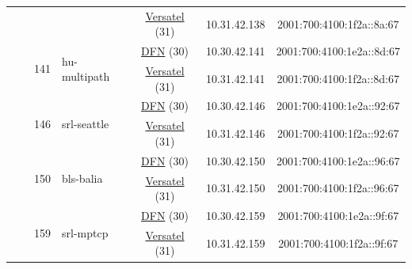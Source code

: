 \begin{small}
\begin{center}
\begin{longtable}{|c|c|c|c|c|c|c|c|}
  &  &  &  & \multicolumn{2}{|c|}{\tiny{\href{http://www.versatel.de}{Versatel} (31)}} & \tiny{10.31.42.138} & \tiny{2001:700:4100:1f2a::8a:67} \\* \cline{3-3}\cline{4-4}\cline{5-5}\cline{6-6}\cline{7-7}\cline{8-8}
  &  & \multirow{2}{*}{\tiny{141}} & \multicolumn{1}{|l|}{\multirow{2}{*}{\tiny{hu-multipath}}} & \multicolumn{2}{|c|}{\tiny{\href{https://www.dfn.de}{DFN} (30)}} & \tiny{10.30.42.141} & \tiny{2001:700:4100:1e2a::8d:67} \\* \cline{5-5}\cline{6-6}\cline{7-7}\cline{8-8}
  &  &  &  & \multicolumn{2}{|c|}{\tiny{\href{http://www.versatel.de}{Versatel} (31)}} & \tiny{10.31.42.141} & \tiny{2001:700:4100:1f2a::8d:67} \\* \cline{3-3}\cline{4-4}\cline{5-5}\cline{6-6}\cline{7-7}\cline{8-8}
  &  & \multirow{2}{*}{\tiny{146}} & \multicolumn{1}{|l|}{\multirow{2}{*}{\tiny{srl-seattle}}} & \multicolumn{2}{|c|}{\tiny{\href{https://www.dfn.de}{DFN} (30)}} & \tiny{10.30.42.146} & \tiny{2001:700:4100:1e2a::92:67} \\* \cline{5-5}\cline{6-6}\cline{7-7}\cline{8-8}
  &  &  &  & \multicolumn{2}{|c|}{\tiny{\href{http://www.versatel.de}{Versatel} (31)}} & \tiny{10.31.42.146} & \tiny{2001:700:4100:1f2a::92:67} \\* \cline{3-3}\cline{4-4}\cline{5-5}\cline{6-6}\cline{7-7}\cline{8-8}
  &  & \multirow{2}{*}{\tiny{150}} & \multicolumn{1}{|l|}{\multirow{2}{*}{\tiny{bls-balia}}} & \multicolumn{2}{|c|}{\tiny{\href{https://www.dfn.de}{DFN} (30)}} & \tiny{10.30.42.150} & \tiny{2001:700:4100:1e2a::96:67} \\* \cline{5-5}\cline{6-6}\cline{7-7}\cline{8-8}
  &  &  &  & \multicolumn{2}{|c|}{\tiny{\href{http://www.versatel.de}{Versatel} (31)}} & \tiny{10.31.42.150} & \tiny{2001:700:4100:1f2a::96:67} \\* \cline{3-3}\cline{4-4}\cline{5-5}\cline{6-6}\cline{7-7}\cline{8-8}
  &  & \multirow{2}{*}{\tiny{159}} & \multicolumn{1}{|l|}{\multirow{2}{*}{\tiny{srl-mptcp}}} & \multicolumn{2}{|c|}{\tiny{\href{https://www.dfn.de}{DFN} (30)}} & \tiny{10.30.42.159} & \tiny{2001:700:4100:1e2a::9f:67} \\* \cline{5-5}\cline{6-6}\cline{7-7}\cline{8-8}
  &  &  &  & \multicolumn{2}{|c|}{\tiny{\href{http://www.versatel.de}{Versatel} (31)}} & \tiny{10.31.42.159} & \tiny{2001:700:4100:1f2a::9f:67} \\ \hline
\end{longtable}
\end{center}
\end{small}



